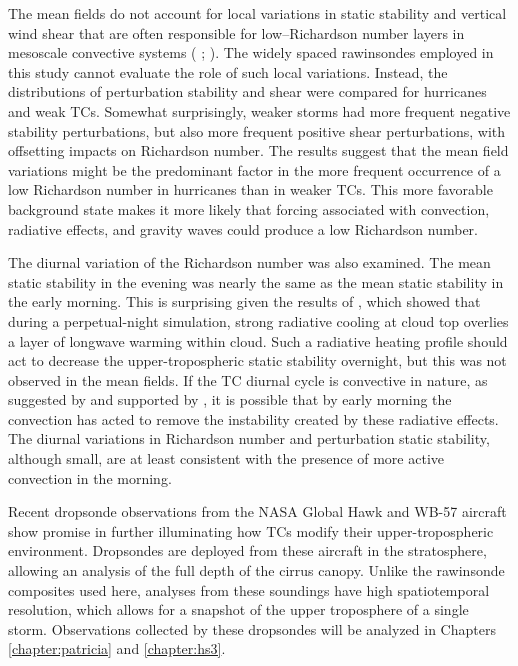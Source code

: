 The mean fields do not account for local variations in static stability and vertical wind shear that are often responsible for low--Richardson number layers in mesoscale convective systems (\citeauthor{Lenzetal2009} \citeyear{Lenzetal2009}; \citeauthor{Trieretal2010} \citeyear{Trieretal2010}).
The widely spaced rawinsondes employed in this study cannot evaluate the role of such local variations.
Instead, the distributions of perturbation stability and shear were compared for hurricanes and weak TCs.
Somewhat surprisingly, weaker storms had more frequent negative stability perturbations, but also more frequent positive shear perturbations, with offsetting impacts on Richardson number.
The results suggest that the mean field variations might be the predominant factor in the more frequent occurrence of a low Richardson number in hurricanes than in weaker TCs.
This more favorable background state makes it more likely that forcing associated with convection, radiative effects, and gravity waves could produce a low Richardson number.

The diurnal variation of the Richardson number was also examined. The mean static stability in the evening was nearly the same as the mean static stability in the early morning.
This is surprising given the results of \cite{MelhauserZhang2014}, which showed that during a perpetual-night simulation, strong radiative cooling at cloud top overlies a layer of longwave warming within cloud.
Such a radiative heating profile should act to decrease the upper-tropospheric static stability overnight, but this was not observed in the mean fields.
If the TC diurnal cycle is convective in nature, as suggested by \cite{Dunionetal2014} and supported by \cite{BowmanFowler2015}, it is possible that by early morning the convection has acted to remove the instability created by these radiative effects.
The diurnal variations in Richardson number and perturbation static stability, although small, are at least consistent with the presence of more active convection in the morning.

Recent dropsonde observations from the NASA Global Hawk and WB-57 aircraft show promise in further illuminating how TCs modify their upper-tropospheric environment.
Dropsondes are deployed from these aircraft in the stratosphere, allowing an analysis of the full depth of the cirrus canopy.
Unlike the rawinsonde composites used here, analyses from these soundings have high spatiotemporal resolution, which allows for a snapshot of the upper troposphere of a single storm.
Observations collected by these dropsondes will be analyzed in Chapters \ref{chapter:patricia} and \ref{chapter:hs3}.

